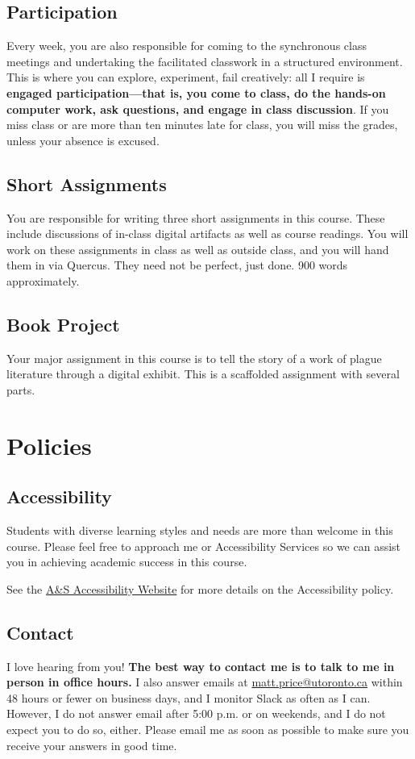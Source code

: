 \documentclass[11pt]{article}
\begin{document}
\subsection*{Participation}
\label{sec:org0c9f569}
Every week, you are also responsible for coming to the synchronous class meetings and undertaking the facilitated classwork in a structured environment.  This is where you can explore, experiment, fail creatively:  all I require is \textbf{engaged participation—that is, you come to class, do the hands-on computer work, ask questions, and engage in class discussion}. If you miss class or are more than ten minutes late for class, you will miss the grades, unless your absence is excused. 
\subsection*{Short Assignments}
\label{sec:orgacba504}
You are responsible for writing three short assignments in this course. These include discussions of in-class digital artifacts as well as course readings. You will work on these assignments in class as well as outside class, and you will hand them in via Quercus. They need not be perfect, just done. 900 words approximately.
\subsection*{Book Project}
\label{sec:orgbc53f3c}
Your major assignment in this course is to tell the story of a work of plague literature through a digital exhibit. This is a scaffolded assignment with several parts. 

\section*{Policies}
\label{sec:org73df263}
\subsection*{Accessibility}
\label{sec:orgf18d638}
Students with diverse learning styles and needs are more than welcome in this course. Please feel free to approach me or Accessibility Services so we can assist you in achieving academic success in this course. 

See the \href{https://studentlife.utoronto.ca/department/accessibility-services/}{A\&S Accessibility Website} for more details on the Accessibility policy.

\subsection*{Contact}
\label{sec:org76f42c1}
I love hearing from you! \textbf{The best way to contact me is to talk to me in person in office hours.} I also answer emails at \href{mailto:matt.price@utoronto.ca}{matt.price@utoronto.ca} within 48 hours or fewer on business days, and I monitor Slack as often as I can. However, I do not answer email after 5:00 p.m. or on weekends, and I do not expect you to do so, either. Please email me as soon as possible to make sure you receive your answers in good time.
\end{document}
